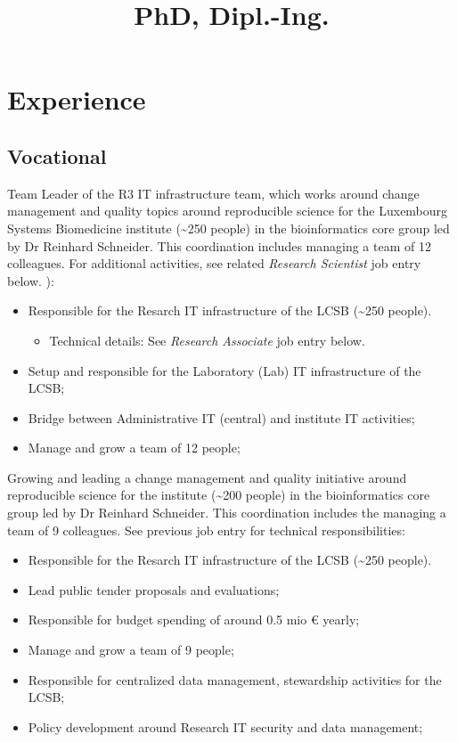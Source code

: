 \documentclass[11pt,a4paper,nolmodern,sans]{moderncv}        %
\title{PhD, Dipl.-Ing.}                               %
\begin{document}
\makecvtitle


\section{Experience}
\subsection{Vocational}

{Team Leader of the R3 IT infrastructure team, which works around change management and quality topics around reproducible science for the Luxembourg Systems Biomedicine institute (\textasciitilde 250 people) in the bioinformatics core group led by Dr Reinhard Schneider. This coordination includes managing a team of 12 colleagues. \newline{} For additional activities, see related \textit{Research Scientist} job entry below. ):
\begin{itemize}
	\item Responsible for the Resarch IT infrastructure of the LCSB (\textasciitilde 250 people). 
	\begin{itemize}
		\item Technical details: See \textit{Research Associate} job entry below.
	\end{itemize}
	\item Setup and responsible for the Laboratory (Lab) IT infrastructure of the LCSB;
	\item Bridge between Administrative IT (central) and institute IT activities;
	\item Manage and grow a team of 12 people;
\end{itemize}} 

{Growing and leading a change management and quality initiative around reproducible science for the institute (\textasciitilde 200 people) in the bioinformatics core group led by Dr Reinhard Schneider. This coordination includes the managing a team of 9 colleagues. \newline{} See previous job entry for technical responsibilities:
\begin{itemize}
	\item Responsible for the Resarch IT infrastructure of the LCSB (\textasciitilde 250 people). 
	\item Lead public tender proposals and evaluations;
	\item Responsible for budget spending of around 0.5 mio € yearly;
	\item Manage and grow a team of 9 people;
	\item Responsible for centralized data management, stewardship activities for the LCSB;
	\item Policy development around Research IT security and data management;
\end{itemize}}
\end{document}
